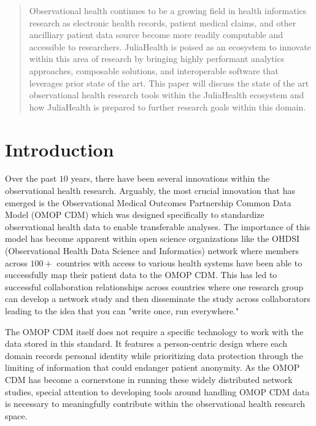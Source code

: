 \documentclass{juliacon}
\begin{document}


\maketitle

\begin{abstract}

Observational health continues to be a growing field in health informatics research as electronic health records, patient medical claims, and other ancilliary patient data source become more readily computable and accessible to researchers.
JuliaHealth is poised as an ecosystem to innovate within this area of research by bringing highly performant analytics approaches, composable solutions, and interoperable software that leverages prior state of the art. 
This paper will discuss the state of the art observational health research tools within the JuliaHealth ecosystem and how JuliaHealth is prepared to further research goals within this domain.

\end{abstract}

\section{Introduction}

Over the past $10$ years, there have been several innovations within the observational health research.
Arguably, the most crucial innovation that has emerged is the Observational Medical Outcomes Partnership Common Data Model (OMOP CDM) which was designed specifically to standardize observational health data to enable transferable analyses.
The importance of this model has become apparent within open science organizations like the OHDSI (Observational Health Data Science and Informatics) network where members across $100+$ countries with access to various health systems have been able to successfully map their patient data to the OMOP CDM.
This has led to successful collaboration relationships across countries where one research group can develop a network study and then disseminate the study across collaborators leading to the idea that you can "write once, run everywhere."

The OMOP CDM itself does not require a specific technology to work with the data stored in this standard.
It features a person-centric design where each domain records personal identity while prioritizing data protection through the limiting of information that could endanger patient anonymity.
As the OMOP CDM has become a cornerstone in running these widely distributed network studies, special attention to developing tools around handling OMOP CDM data is necessary to meaningfully contribute within the observational health research space.
\end{document}
